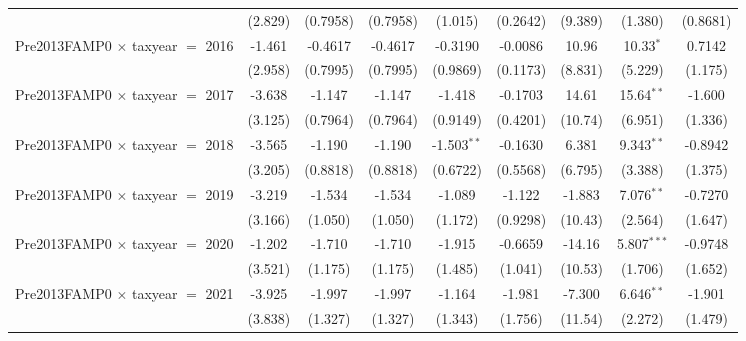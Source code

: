 {\begin{tabular}{lcccccccc}
                                           & (2.829)       & (0.7958)      & (0.7958)      & (1.015)       & (0.2642)       & (9.389)       & (1.380)       & (0.8681)\\   
   Pre2013FAMP0 $\times$ taxyear $=$ 2016  & -1.461        & -0.4617       & -0.4617       & -0.3190       & -0.0086        & 10.96         & 10.33$^{*}$   & 0.7142\\   
                                           & (2.958)       & (0.7995)      & (0.7995)      & (0.9869)      & (0.1173)       & (8.831)       & (5.229)       & (1.175)\\   
   Pre2013FAMP0 $\times$ taxyear $=$ 2017  & -3.638        & -1.147        & -1.147        & -1.418        & -0.1703        & 14.61         & 15.64$^{**}$  & -1.600\\   
                                           & (3.125)       & (0.7964)      & (0.7964)      & (0.9149)      & (0.4201)       & (10.74)       & (6.951)       & (1.336)\\   
   Pre2013FAMP0 $\times$ taxyear $=$ 2018  & -3.565        & -1.190        & -1.190        & -1.503$^{**}$ & -0.1630        & 6.381         & 9.343$^{**}$  & -0.8942\\   
                                           & (3.205)       & (0.8818)      & (0.8818)      & (0.6722)      & (0.5568)       & (6.795)       & (3.388)       & (1.375)\\   
   Pre2013FAMP0 $\times$ taxyear $=$ 2019  & -3.219        & -1.534        & -1.534        & -1.089        & -1.122         & -1.883        & 7.076$^{**}$  & -0.7270\\   
                                           & (3.166)       & (1.050)       & (1.050)       & (1.172)       & (0.9298)       & (10.43)       & (2.564)       & (1.647)\\   
   Pre2013FAMP0 $\times$ taxyear $=$ 2020  & -1.202        & -1.710        & -1.710        & -1.915        & -0.6659        & -14.16        & 5.807$^{***}$ & -0.9748\\   
                                           & (3.521)       & (1.175)       & (1.175)       & (1.485)       & (1.041)        & (10.53)       & (1.706)       & (1.652)\\   
   Pre2013FAMP0 $\times$ taxyear $=$ 2021  & -3.925        & -1.997        & -1.997        & -1.164        & -1.981         & -7.300        & 6.646$^{**}$  & -1.901\\   
                                           & (3.838)       & (1.327)       & (1.327)       & (1.343)       & (1.756)        & (11.54)       & (2.272)       & (1.479)\\   

\end{tabular}}
